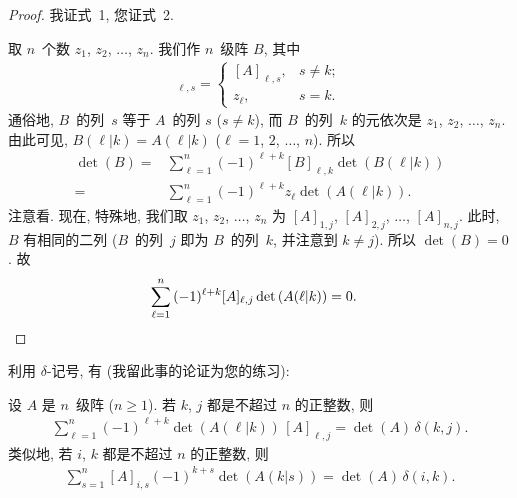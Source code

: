 \documentclass[%
    UTF8,%
    fontset=none,%
    punct=kaiming,%
    zihao=-4,%
    a4paper,%
    oneside,%
]{ctexbook}
\renewcommand*{\geq}{\geqslant}
\begin{document}
\begin{proof}
    我证式~1, 您证式~2.

    取 \(n\)~个数 \(z_1\), \(z_2\), \(\dots\), \(z_n\).
    我们作 \(n\)~级阵 \(B\), 其中
    \begin{align*}
        [B]_{\ell, s} =
        \begin{cases}
            [A]_{\ell, s}, & s \neq k; \\
            z_\ell,        & s = k.
        \end{cases}
    \end{align*}
    通俗地, \(B\)~的列~\(s\) 等于 \(A\)~的列 \(s\)
    (\(s \neq k\)),
    而 \(B\)~的列~\(k\) 的元依次是
    \(z_1\), \(z_2\), \(\dots\), \(z_n\).
    由此可见, \(B(\ell|k) = A(\ell|k)\)
    (\(\ell = 1\), \(2\), \(\dots\), \(n\)).
    所以
    \begin{align*}
        \det {(B)}
        = {} & \sum_{\ell = 1}^{n}
        {(-1)^{\ell + k} [B]_{\ell, k} \det {(B(\ell|k))}}
        \\
        = {} & \sum_{\ell = 1}^{n}
        {(-1)^{\ell + k} z_\ell \det {(A(\ell|k))}}.
    \end{align*}
    注意看.
    现在, 特殊地, 我们取
    \(z_1\), \(z_2\), \(\dots\), \(z_n\)
    为
    \([A]_{1,j}\), \([A]_{2,j}\), \(\dots\), \([A]_{n,j}\).
    此时, \(B\) 有相同的二列
    (\(B\)~的列~\(j\) 即为 \(B\)~的列~\(k\),
    并注意到 \(k \neq j\)).
    所以 \(\det {(B)} = 0\).
    故
    \begin{align*}
         &
        \sum_{\ell = 1}^{n}
        {(-1)^{\ell+k} [A]_{\ell,j} \det {(A(\ell|k))}}
        = 0.
        \qedhere
    \end{align*}
\end{proof}

利用 \(\delta\)-记号, 有
(我留此事的论证为您的练习):

\begin{theorem}
    设 \(A\) 是 \(n\)~级阵 (\(n \geq 1\)).
    若 \(k\), \(j\) 都是不超过 \(n\) 的正整数,
    则
    \begin{align*}
        \sum_{\ell = 1}^{n}
        {(-1)^{\ell+k} \det {(A(\ell|k))}\, [A]_{\ell,j}}
        = \det {(A)}\, \delta(k, j).
    \end{align*}
    类似地, 若 \(i\), \(k\) 都是不超过 \(n\) 的正整数,
    则
    \begin{align*}
        \sum_{s = 1}^{n}
        {[A]_{i,s} (-1)^{k+s} \det {(A(k|s))}}
        = \det{(A)}\, \delta(i, k).
    \end{align*}
\end{theorem}
\end{document}
